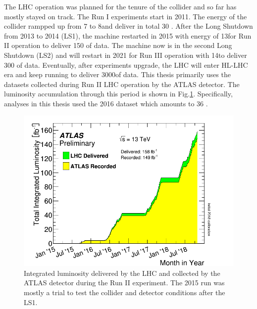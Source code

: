 The LHC operation was planned for the tenure of the collider and so far has mostly stayed on track. The Run I experiments start in 2011. The energy of the collider rampped up from 7 to 8\tev and deliver in total 30 \ifb. After the Long Shutdown from 2013 to 2014 (LS1), the machine restarted in 2015 with energy of 13\tev for Run II operation to deliver 150 \ifb of data. The machine now is in the second Long Shutdown (LS2) and will restart in 2021 for Run III operation with 14\tev to deliver 300 \ifb of data. Eventually, after experiments upgrade, the LHC will enter HL-LHC era and keep running to deliver 3000\ifb of data. This thesis primarily uses the datasets collected during Run II LHC operation by the ATLAS detector. The luminosity accumulation through this period is shown in Fig.\ref{fig:lhc-lumi}. Specifically, analyses in this thesis used the 2016 dataset which amounts to 36 \ifb.


\begin{figure}[htpb!]
\begin{center}
  \includegraphics[width=0.6\linewidth]{figures/LHC/intlumivstimeRun2.png}
\caption{Integrated luminosity delivered by the LHC and collected by the ATLAS detector during the Run II experiment. The 2015 run was mostly a trial to test the collider and detector conditions after the LS1.}
\label{fig:lhc-lumi}
\end{center}
\end{figure}
